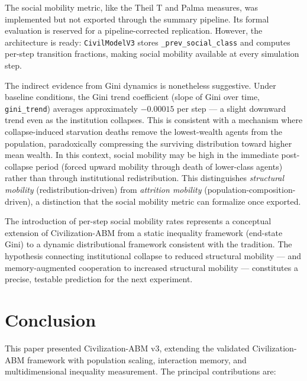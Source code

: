 \documentclass[12pt, letterpaper]{article}
\begin{document}
The social mobility metric, like the Theil T and Palma measures,
was implemented but not exported through the summary pipeline. Its
formal evaluation is reserved for a pipeline-corrected replication.
However, the architecture is ready: \texttt{CivilModelV3} stores
\texttt{\_prev\_social\_class} and computes per-step transition fractions,
making social mobility available at every simulation step.

The indirect evidence from Gini dynamics is nonetheless suggestive.
Under baseline conditions, the Gini trend coefficient (slope of Gini
over time, \texttt{gini\_trend}) averages approximately $-0.00015$ per
step --- a slight downward trend even as the institution collapses.
This is consistent with a mechanism where collapse-induced starvation
deaths remove the lowest-wealth agents from the population, paradoxically
compressing the surviving distribution toward higher mean wealth. In
this context, social mobility may be high in the immediate post-collapse
period (forced upward mobility through death of lower-class agents)
rather than through institutional redistribution. This distinguishes
\emph{structural mobility} (redistribution-driven) from
\emph{attrition mobility} (population-composition-driven), a
distinction that the social mobility metric can formalize once exported.

The introduction of per-step social mobility rates represents a
conceptual extension of Civilization-ABM from a static inequality
framework (end-state Gini) to a dynamic distributional framework
consistent with the \citet{chetty2014} tradition. The hypothesis
connecting institutional collapse to reduced structural mobility ---
and memory-augmented cooperation to increased structural mobility ---
constitutes a precise, testable prediction for the next experiment.


\section{Conclusion}

This paper presented Civilization-ABM v3, extending the validated
Civilization-ABM framework with population scaling, interaction memory,
and multidimensional inequality measurement. The principal contributions
are:
\end{document}
